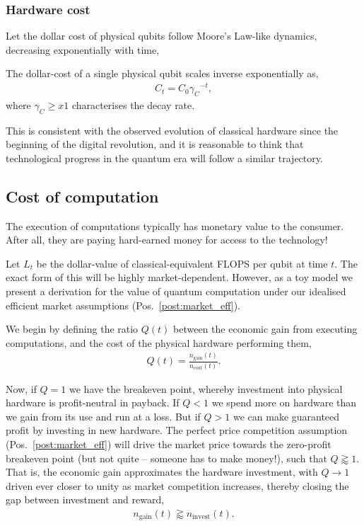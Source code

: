 \subsubsection{Hardware cost} 

Let the dollar cost of physical qubits follow Moore's Law-like dynamics, decreasing exponentially with time,
\begin{postulate}\label{post:hardware_cost}
The dollar-cost of a single physical qubit scales inverse exponentially as,
\begin{align}
	C_t = C_0 {\gamma_C}^{-t},
\end{align}
where \mbox{$\gamma_C\geq x1$} characterises the decay rate.
\end{postulate}

This is consistent with the observed evolution of classical hardware since the beginning of the digital revolution, and it is reasonable to think that technological progress in the quantum era will follow a similar trajectory.

%
%

\subsection{Cost of computation}\label{sec:cost_of_comp} 

The execution of computations typically has monetary value to the consumer. After all, they are paying hard-earned money for access to the technology!

Let $L_t$ be the dollar-value of classical-equivalent FLOPS per qubit at time $t$. The exact form of this will be highly market-dependent. However, as a toy model we present a derivation for the value of quantum computation under our idealised efficient market assumptions (Pos.~\ref{post:market_eff}).

We begin by defining the ratio $Q(t)$ between the economic gain from executing computations, and the cost of the physical hardware performing them,
\begin{align}
Q(t)=\frac{n_\text{gain}(t)}{n_\text{cost}(t)}.
\end{align}

Now, if \mbox{$Q=1$} we have the breakeven point, whereby investment into physical hardware is profit-neutral in payback. If \mbox{$Q<1$} we spend more on hardware than we gain from its use and run at a loss. But if \mbox{$Q>1$} we can make guaranteed profit by investing in new hardware. The perfect price competition assumption (Pos.~\ref{post:market_eff}) will drive the market price towards the zero-profit breakeven point (but not quite -- someone has to make money!), such that \mbox{$Q\gtrapprox 1$}. That is, the economic gain approximates the hardware investment, with \mbox{$Q\to 1$} driven ever closer to unity as market competition increases, thereby closing the gap between investment and reward,
\begin{align} \label{sec:gain_eq_invest}
	n_\text{gain}(t) \gtrapprox n_\text{invest}(t).
\end{align}

